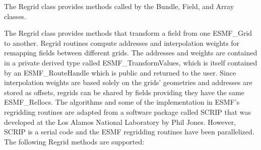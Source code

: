 %

The Regrid class provides methods called by the Bundle, Field, and Array classes.


The Regrid class provides methods that transform a field from one ESMF\_Grid to
another.  Regrid routines compute addresses and interpolation weights for
remapping fields between different grids.  The addresses and weights
are contained in a private derived type called ESMF\_TransformValues, which is
itself contained by an ESMF\_RouteHandle which is public and returned to the
user.  Since interpolation weights are based solely on the grids' geometries
and addresses are stored as offsets, regrids can be shared by fields providing
they have the same ESMF\_Rellocs.  The algorithms and some of the
implementation in ESMF's regridding routines are adapted from a software package
called SCRIP that was developed at the Los Alamos National Laboratory by Phil
Jones.  However, SCRIP is a serial code and the ESMF regridding routines have
been parallelized.  The following Regrid methods are supported:

